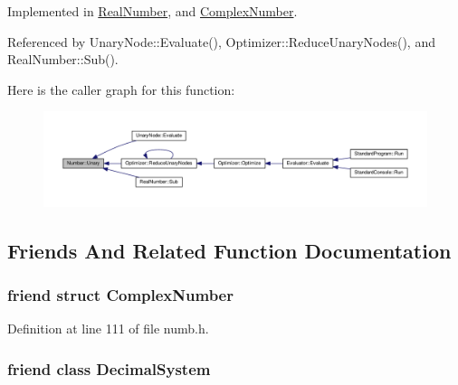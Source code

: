 Implemented in \hyperlink{structRealNumber_a0370c55b92e3ec36270a894918ae53ca}{Real\+Number}, and \hyperlink{structComplexNumber_a52bb791f848e90072a65841c7402b2c4}{Complex\+Number}.



Referenced by Unary\+Node\+::\+Evaluate(), Optimizer\+::\+Reduce\+Unary\+Nodes(), and Real\+Number\+::\+Sub().



Here is the caller graph for this function\+:
\nopagebreak
\begin{figure}[H]
\begin{center}
\leavevmode
\includegraphics[width=350pt]{da/de2/structNumber_a4283e401f772614fc566db78087cf860_icgraph}
\end{center}
\end{figure}




\subsection{Friends And Related Function Documentation}
\subsubsection[{\texorpdfstring{Complex\+Number}{ComplexNumber}}]{\setlength{\rightskip}{0pt plus 5cm}friend struct {\bf Complex\+Number}\hspace{0.3cm}{\ttfamily [friend]}}\hypertarget{structNumber_ae59451cc698db2f80a85244883578673}{}\label{structNumber_ae59451cc698db2f80a85244883578673}


Definition at line 111 of file numb.\+h.

\subsubsection[{\texorpdfstring{Decimal\+System}{DecimalSystem}}]{\setlength{\rightskip}{0pt plus 5cm}friend class {\bf Decimal\+System}\hspace{0.3cm}{\ttfamily [friend]}}\hypertarget{structNumber_a78cb487a959b6767c06f83cb19aafc43}{}\label{structNumber_a78cb487a959b6767c06f83cb19aafc43}


